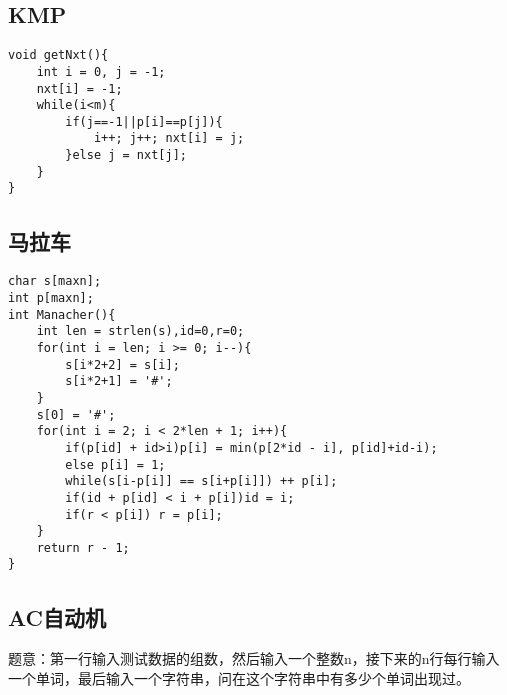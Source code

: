 \subsection{KMP}

\begin{lstlisting}
void getNxt(){
    int i = 0, j = -1;
    nxt[i] = -1;
    while(i<m){
        if(j==-1||p[i]==p[j]){
            i++; j++; nxt[i] = j;
        }else j = nxt[j];
    }
}
\end{lstlisting}


\subsection{马拉车}
\begin{lstlisting}
char s[maxn];
int p[maxn];
int Manacher(){
    int len = strlen(s),id=0,r=0;
    for(int i = len; i >= 0; i--){
        s[i*2+2] = s[i];
        s[i*2+1] = '#';
    }
    s[0] = '#';
    for(int i = 2; i < 2*len + 1; i++){
        if(p[id] + id>i)p[i] = min(p[2*id - i], p[id]+id-i);
        else p[i] = 1;
        while(s[i-p[i]] == s[i+p[i]]) ++ p[i];
        if(id + p[id] < i + p[i])id = i;
        if(r < p[i]) r = p[i];
    }
    return r - 1;
}
\end{lstlisting}

\subsection{AC自动机}

题意：第一行输入测试数据的组数，然后输入一个整数n，接下来的n行每行输入一个单词，最后输入一个字符串，问在这个字符串中有多少个单词出现过。

